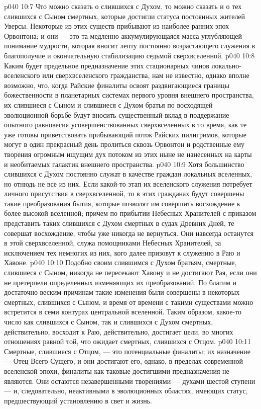 \vs p040 10:7 Что можно сказать о слившихся с Духом, то можно сказать и о тех слившихся с Сыном смертных, которые достигли статуса постоянных жителей Уверсы. Некоторые из этих существ прибывают из наиболее ранних эпох Орвонтона; и они --- это та медленно аккумулирующаяся масса углубляющей понимание мудрости, которая вносит лепту постоянно возрастающего служения в благополучие и окончательную стабилизацию седьмой сверхвселенной.
\vs p040 10:8 \pc Каким будет предельное предназначение этих стационарных чинов локально\hyp{}вселенского или сверхвселенского гражданства, нам не известно, однако вполне возможно, что, когда Райские финалиты освоят раздвигающиеся границы божественности в планетарных системах первого уровня внешнего пространства, их слившиеся с Сыном и слившиеся с Духом братья по восходящей эволюционной борьбе будут вносить существенный вклад в поддержание опытного равновесия усовершенствованных сверхвселенных в то время, как те уже готовы приветствовать прибывающий поток Райских пилигримов, которые могут в один прекрасный день пролиться сквозь Орвонтон и родственные ему творения огромным ищущим дух потоком из этих ныне не нанесенных на карты и необитаемых галактик внешнего пространства.
\vs p040 10:9 \pc Хотя большинство слившихся с Духом постоянно служат в качестве граждан локальных вселенных, но отнюдь не все из них. Если какой\hyp{}то этап их вселенского служения потребует личного присутствия в сверхвселенной, то в этих гражданах будут совершены такие преобразования бытия, которые позволят им совершить восхождение к более высокой вселенной; причем по прибытии Небесных Хранителей с приказом представить таких слившихся с Духом смертных в судах Древних Дней, те совершат восхождение, чтобы уже никогда не вернуться. Они навсегда останутся в этой сверхвселенной, служа помощниками Небесных Хранителей, за исключением тех немногих из них, кого далее призовут к служению в Раю и Хавоне.
\vs p040 10:10 Подобно своим слившимся с Духом братьям, смертные, слившиеся с Сыном, никогда не пересекают Хавону и не достигают Рая, если они не претерпели определенных изменяющих их преобразований. По благим и достаточно веским причинам такие изменения были совершены в некоторых смертных, слившихся с Сыном, и время от времени с такими существами можно встретится в семи контурах центральной вселенной. Таким образом, какое\hyp{}то число как слившихся с Сыном, так и слившихся с Духом смертных, действительно, восходит к Раю, действительно, достигает цели, во многих отношениях равной той, что ожидает смертных, слившихся с Отцом.
\vs p040 10:11 Смертные, слившиеся с Отцом, --- это потенциальные финалиты; их назначение --- Отец Всего Сущего, и они достигают его, однако, в пределах современной вселенской эпохи, финалиты как таковые достигшими предназначения не являются. Они остаются незавершенными творениями --- духами шестой ступени --- и, следовательно, неактивными в эволюционных областях, имеющих статус, предшествующий установлению в свет и жизнь.
